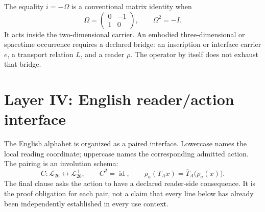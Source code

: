 \documentclass[11pt]{article}
\begin{document}
The equality $i=-\Omega$ is a conventional matrix identity when
\begin{equation}
\Omega=\begin{pmatrix}0&-1\\1&0\end{pmatrix},\qquad \Omega^2=-I.
\label{eq:omega}
\end{equation}
It acts inside the two-dimensional carrier. An embodied three-dimensional or spacetime occurrence requires a declared bridge: an inscription or interface carrier $e$, a transport relation $L$, and a reader $\rho$. The operator by itself does not exhaust that bridge.

\section{Layer IV: English reader/action interface}
The English alphabet is organized as a paired interface. Lowercase names the local reading coordinate; uppercase names the corresponding admitted action. The pairing is an involution schema:
\begin{equation}
C:\mathcal{L}_{26}^{-}\longleftrightarrow\mathcal{L}_{26}^{+},
\qquad C^2=\operatorname{id},
\qquad \rho_a(T_Ax)=\overline{T}_A\bigl(\rho_a(x)\bigr).
\label{eq:english}
\end{equation}
The final clause asks the action to have a declared reader-side consequence. It is the proof obligation for each pair, not a claim that every line below has already been independently established in every use context.
\end{document}
